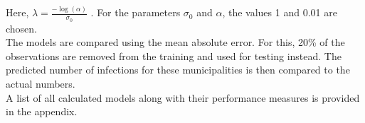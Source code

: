 Here, $\lambda=\frac{-\log\left(\alpha\right)}{\sigma_0}$ \cite{martins2014penalising}.
For the parameters $\sigma_0$ and $\alpha$, the values 1 and 0.01 are chosen. \\
The models are compared using the mean absolute error. For this, 20\% of the observations are removed from the training and used for testing instead. The predicted number of infections for these municipalities is then compared to the actual numbers.
\\
A list of all calculated models along with their performance measures is provided in the appendix.
